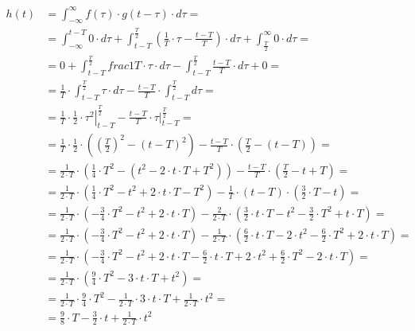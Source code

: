 \begin{task}
\begin{align*}
h(t)&=\int_{-\infty}^{\infty} f(\tau) \cdot g(t-\tau) \cdot d\tau=\\
&=\int_{-\infty}^{t-T} 0 \cdot d\tau 
+ \int_{t-T}^{\frac{T}{2}}\left( \frac{1}{T}\cdot \tau - \frac{t-T}{T} \right)\cdot d\tau 
+\int_{\frac{T}{2}}^{\infty} 0 \cdot d\tau=\\
&=0
+ \int_{t-T}^{\frac{T}{2}} frac{1}{T}\cdot \tau \cdot d\tau - \int_{t-T}^{\frac{T}{2}} \frac{t-T}{T} \cdot d\tau 
+0=\\
&=\frac{1}{T}\cdot \int_{t-T}^{\frac{T}{2}}  \tau \cdot d\tau - \frac{t-T}{T} \cdot \int_{t-T}^{\frac{T}{2}}  d\tau=\\
&=\frac{1}{T}\cdot \left. \frac{1}{2} \cdot \tau^2 \right|_{t-T}^{\frac{T}{2}} - \frac{t-T}{T} \cdot \left.  \tau \right|_{t-T}^{\frac{T}{2}}=\\
&=\frac{1}{T}\cdot \frac{1}{2} \cdot \left(  \left(\frac{T}{2}\right)^2 - \left(t-T\right)^2\right) - \frac{t-T}{T} \cdot \left(  \frac{T}{2} - \left(t-T\right)\right)=\\
&=\frac{1}{2 \cdot T} \cdot \left(  \frac{1}{4}\cdot T^2 - \left(t^2 -2\cdot t \cdot T + T^2 \right)\right) - \frac{t-T}{T} \cdot \left(  \frac{T}{2} - t+T\right)=\\
&=\frac{1}{2 \cdot T} \cdot \left(  \frac{1}{4}\cdot T^2 -t^2 +2\cdot t \cdot T - T^2 \right) - \frac{1}{T} \cdot \left(t-T\right)\cdot \left(  \frac{3}{2}\cdot T - t\right)=\\
&=\frac{1}{2 \cdot T} \cdot \left(  -\frac{3}{4}\cdot T^2 -t^2 +2\cdot t \cdot T \right) - \frac{2}{2\cdot T} \cdot \left(\frac{3}{2} \cdot t \cdot T - t^2 - \frac{3}{2}\cdot T^2 + t \cdot T\right)=\\
&=\frac{1}{2 \cdot T} \cdot \left(  -\frac{3}{4}\cdot T^2 -t^2 +2\cdot t \cdot T \right) - \frac{1}{2 \cdot T} \cdot \left(\frac{6}{2} \cdot t \cdot T - 2\cdot t^2 - \frac{6}{2}\cdot T^2 + 2\cdot t \cdot T\right)=\\
&=\frac{1}{2 \cdot T} \cdot \left(  -\frac{3}{4}\cdot T^2 -t^2 +2\cdot t \cdot T  - \frac{6}{2} \cdot t \cdot T + 2\cdot t^2 + \frac{6}{2}\cdot T^2 - 2\cdot t \cdot T\right)=\\
&=\frac{1}{2 \cdot T} \cdot \left(  \frac{9}{4}\cdot T^2 -3\cdot t \cdot T  +  t^2 \right)=\\
&=\frac{1}{2 \cdot T} \cdot  \frac{9}{4}\cdot T^2 - \frac{1}{2 \cdot T} \cdot 3\cdot t \cdot T  +  \frac{1}{2 \cdot T} \cdot t^2=\\
&=\frac{9}{8}\cdot T - \frac{3}{2} \cdot t  +  \frac{1}{2 \cdot T} \cdot t^2
\end{align*}


\end{task}
